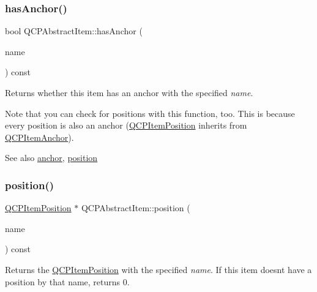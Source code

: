 \mbox{\label{class_q_c_p_abstract_item_a84914f4516f9b38ef0bd89eafe3dbda7}} 
\subsubsection{\texorpdfstring{hasAnchor()}{hasAnchor()}}
{\footnotesize\ttfamily bool Q\+C\+P\+Abstract\+Item\+::has\+Anchor (\begin{DoxyParamCaption}\item[{const Q\+String \&}]{name }\end{DoxyParamCaption}) const}

Returns whether this item has an anchor with the specified {\itshape name}.

Note that you can check for positions with this function, too. This is because every position is also an anchor (\mbox{\hyperlink{class_q_c_p_item_position}{Q\+C\+P\+Item\+Position}} inherits from \mbox{\hyperlink{class_q_c_p_item_anchor}{Q\+C\+P\+Item\+Anchor}}).

\begin{DoxySeeAlso}{See also}
\mbox{\hyperlink{class_q_c_p_abstract_item_a139c255ea8831642fac91748e29a5adb}{anchor}}, \mbox{\hyperlink{class_q_c_p_abstract_item_a2589c3d298f9a576d77d9addb440a18d}{position}} 
\end{DoxySeeAlso}
\mbox{\label{class_q_c_p_abstract_item_a2589c3d298f9a576d77d9addb440a18d}} 
\subsubsection{\texorpdfstring{position()}{position()}}
{\footnotesize\ttfamily \mbox{\hyperlink{class_q_c_p_item_position}{Q\+C\+P\+Item\+Position}} $\ast$ Q\+C\+P\+Abstract\+Item\+::position (\begin{DoxyParamCaption}\item[{const Q\+String \&}]{name }\end{DoxyParamCaption}) const}

Returns the \mbox{\hyperlink{class_q_c_p_item_position}{Q\+C\+P\+Item\+Position}} with the specified {\itshape name}. If this item doesn\textquotesingle{}t have a position by that name, returns 0.

